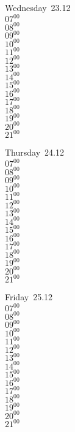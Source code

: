 \documentclass[11pt,a4paper]{book}\usepackage[]{graphicx}\usepackage[]{color}
\begin{document}
\begin{weekdaybox}
  Wednesday~23.12\\
  { 
  \vfill
  $07^{00}$\\
$08^{00}$\\
$09^{00}$\\
$10^{00}$\\
$11^{00}$\\
$12^{00}$\\
$13^{00}$\\
$14^{00}$\\
$15^{00}$\\
$16^{00}$\\
$17^{00}$\\
$18^{00}$\\
$19^{00}$\\
$20^{00}$\\
$21^{00}$\\
  }
\end{weekdaybox}
\clearpage
\begin{headerbox}
\end{headerbox}
\begin{weekdaybox}
  Thursday~24.12\\
  { 
  \vfill
  $07^{00}$\\
$08^{00}$\\
$09^{00}$\\
$10^{00}$\\
$11^{00}$\\
$12^{00}$\\
$13^{00}$\\
$14^{00}$\\
$15^{00}$\\
$16^{00}$\\
$17^{00}$\\
$18^{00}$\\
$19^{00}$\\
$20^{00}$\\
$21^{00}$\\
  }
\end{weekdaybox} 
\begin{weekdaybox}
  Friday~25.12\\
  { 
  \vfill
  $07^{00}$\\
$08^{00}$\\
$09^{00}$\\
$10^{00}$\\
$11^{00}$\\
$12^{00}$\\
$13^{00}$\\
$14^{00}$\\
$15^{00}$\\
$16^{00}$\\
$17^{00}$\\
$18^{00}$\\
$19^{00}$\\
$20^{00}$\\
$21^{00}$\\
  }
\end{weekdaybox}
\end{document}
